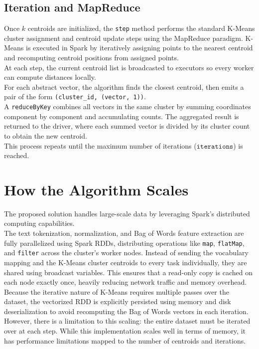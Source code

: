 \documentclass{report}
\begin{document}
\subsection{Iteration and MapReduce}
Once $k$ centroids are initialized, the \verb|step| method performs the standard K-Means cluster assignment and centroid update steps using the MapReduce paradigm.
K-Means is executed in Spark by iteratively assigning points to the nearest centroid and recomputing centroid positions from assigned points. 
\\
At each step, the current centroid list is broadcasted to executors so every worker can compute distances locally.
\\
For each abstract vector, the algorithm finds the closest centroid, then emits a pair of the form \texttt{(cluster\_id, (vector, 1))}. 
\\
A \verb|reduceByKey| combines all vectors in the same cluster by summing coordinates component by component and accumulating counts. 
The aggregated result is returned to the driver, where each summed vector is divided by its cluster count to obtain the new centroid.
\\
This process repeats until the maximum number of iterations ($\texttt{iterations}$) is reached.

\section{How the Algorithm Scales}
The proposed solution handles large-scale data by leveraging Spark's distributed computing capabilities. 
\\
The text tokenization, normalization, and Bag of Words feature extraction are fully parallelized using Spark RDDs, distributing operations like \verb|map|, \verb|flatMap|, and \verb|filter| across the cluster's worker nodes. Instead of sending the vocabulary mapping and the K-Means cluster centroids to every task individually, they are shared using broadcast variables. This ensures that a read-only copy is cached on each node exactly once, heavily reducing network traffic and memory overhead. 
\\
Because the iterative nature of K-Means requires multiple passes over the dataset, the vectorized RDD is explicitly persisted using memory and disk deserialization to avoid recomputing the Bag of Words vectors in each iteration. 
\\
However, there is a limitation to this scaling: the entire dataset must be iterated over at each step. While this implementation scales well in terms of memory, it has performance limitations mapped to the number of centroids and iterations.
\end{document}
